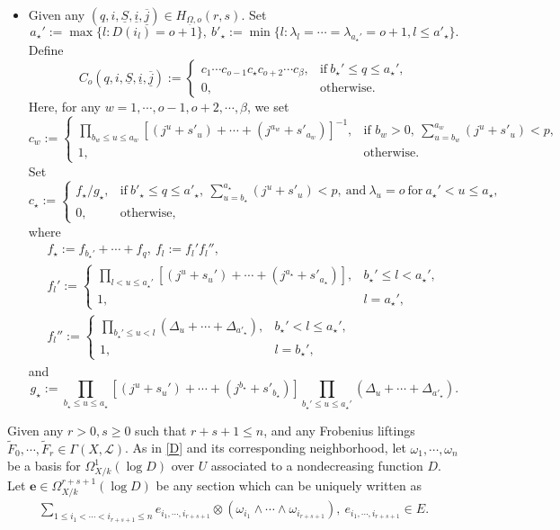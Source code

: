 \documentclass[12pt, a4paper]{article}
\begin{document}
\begin{itemize}
  \item Given any $(q,i,\underline S,\underline i,\underline{\overline j})\in H_{\underline\Omega,o}(r,s)$. Set
  $$
  a_\star':=\max\{l:D(i_l)=o+1\},~b'_\star := \min \{l : \lambda_l=\cdots=\lambda_{a_\star'} = o+1,l\leq a'_\star\}.
  $$
  Define 
  $$
  C_o(q,i,\underline S,\underline i,\underline{\overline j}):=\left\{
\begin{matrix}
c_1\cdots c_{o-1}c_\star c_{o+2}\cdots c_\beta,&\mathrm{if}~b_\star'\leq q\leq a_\star',\\
0,&\mathrm{otherwise}.
\end{matrix}
  \right.
  $$
Here, for any $w=1,\cdots,o-1,o+2,\cdots,\beta$, we set
   \[
c_w:= 
\begin{cases}
\prod_{b_w \leq u \leq a_w}[(j^u+s'_u)+ \cdots +(j^{a_w}+s'_{a_w})]^{-1}, & \text{if } b_w > 0,~\sum_{u=b_w}^{a_w}(j^u+s'_u)<p, \\
1, & \text{otherwise}.
\end{cases}
\]  
Set
$$
c_\star:=\left\{
\begin{matrix}
 f_\star/g_\star,&\mathrm{if}~b'_\star\leq q\leq a'_\star,
~\sum_{u=b_\star}^{a_\star}(j^u+s'_u)<p,~\mathrm{and}~\lambda_u=o~\mathrm{for}~a_\star'<u\leq a_\star,\\
0,&\mathrm{otherwise},
\end{matrix}
\right.
$$
where
$$
\begin{array}{c}
f_\star:=f_{b_\star'}+\cdots+f_q,~f_l:=f_l'f_l'',\\
f_l':=\left\{
\begin{matrix}
\prod_{l<u\leq a_\star'}[(j^u+s_u')+\cdots+(j^{a_\star}+s'_{a_\star})],&b_\star'\leq l<a_\star',\\
1,&l=a_\star',
\end{matrix}
\right.\\
f_l'':=\left\{
\begin{matrix}
\prod_{b_\star'\leq u<l}(\Delta_u+\cdots+\Delta_{a'_\star}),&b_\star'<l\leq a_\star',\\
1,&l=b_\star',
\end{matrix}
\right.
\end{array}
$$
and
$$
g_\star:=\prod_{b_\star\leq u\leq a_\star}[(j^u+s_u')+\cdots+(j^{b_\star}+s'_{b_\star})]\prod_{b_\star'\leq u\leq a_\star'}(\Delta_u+\cdots+\Delta_{a'_\star}).
$$
\end{itemize}

Given any $r>0,s\geq0$ such that $r+s+1\leq n$, and any Frobenius liftings $\tilde F_0,\cdots,\tilde F_r\in\Gamma(X,\mathcal L)$. As in \eqref{D} and its corresponding neighborhood, let $\omega_1,\cdots,\omega_n$ be a basis for $\Omega^1_{X/k}(\log D)$ over $U$ associated to a nondecreasing function $D$. Let $\boldsymbol{e}\in\Omega^{r+s+1}_{X/k}(\log D)$ be any section which can be uniquely written as 
\begin{eqnarray}\label{bold e r+s+1}
\sum_{1\leq i_1<\cdots<i_{r+s+1}\leq n}e_{i_1,\cdots,i_{r+s+1}}\otimes(\omega_{i_1}\wedge\cdots\wedge\omega_{i_{r+s+1}}),~e_{i_1,\cdots,i_{r+s+1}}\in E.
\end{eqnarray}
\end{document}
